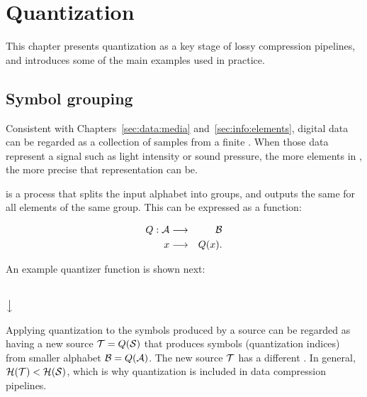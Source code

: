 \chapter{Quantization}\label{sec:quantization}

This chapter presents quantization as a key stage of lossy compression pipelines,
and introduces some of the main examples used in practice.

\section{Symbol grouping}

Consistent with Chapters~\ref{sec:data:media} and~\ref{sec:info:elements},
digital data can be regarded as a collection of samples from a
finite  \alphabet.
%
When those data represent a  signal such as light intensity
or sound pressure, the more elements in \alphabet, the more precise that representation
can be.

\begin{center}

\end{center}

 is a process that splits the input
alphabet into groups, and outputs the same 
for all elements of the same group. This can be expressed as a 
function:

\begin{center}
\begin{minipage}{0.4\linewidth}
\begin{eqnarray*}
Q:\mathcal{A} & \longrightarrow & \mathcal{B}\\
  x & \longrightarrow & Q(x).
\end{eqnarray*}
\end{minipage}
\end{center}

An example quantizer function is shown next:

\begin{center}
\alphabet \\
$\big\downarrow$\\
\otheralphabet 
\end{center}


Applying quantization to the symbols produced by a source \source
can be regarded as having a new source $\mathcal{T}=Q(\mathcal{S})$ that produces
symbols (quantization indices) from smaller alphabet $\mathcal{B}=Q(\mathcal{A})$.
%
The new source $\mathcal{T}$ has a different .
In general, $\mathcal{H}(\mathcal{T}) < \mathcal{H}(\mathcal{S})$, which is why quantization
is included in data compression pipelines.

